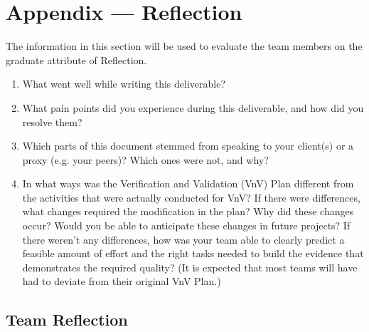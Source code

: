 \documentclass[12pt, titlepage]{article}
\begin{document}
\newpage{}
\section*{Appendix --- Reflection}

The information in this section will be used to evaluate the team members on the
graduate attribute of Reflection.



\begin{enumerate}
  \item What went well while writing this deliverable? 
  \item What pain points did you experience during this deliverable, and how
    did you resolve them?
  \item Which parts of this document stemmed from speaking to your client(s) or
  a proxy (e.g. your peers)? Which ones were not, and why?
  \item In what ways was the Verification and Validation (VnV) Plan different
  from the activities that were actually conducted for VnV?  If there were
  differences, what changes required the modification in the plan?  Why did
  these changes occur?  Would you be able to anticipate these changes in future
  projects?  If there weren't any differences, how was your team able to clearly
  predict a feasible amount of effort and the right tasks needed to build the
  evidence that demonstrates the required quality?  (It is expected that most
  teams will have had to deviate from their original VnV Plan.)
\end{enumerate}

\subsection*{Team Reflection}
\end{document}
